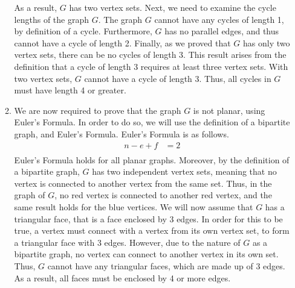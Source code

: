 \documentclass[a4paper]{article}
\begin{document}
\begin{enumerate}[label=\textbf{\arabic*.}]
\begin{enumerate}
\begin{center}
\begin{tikzpicture}
			\end{tikzpicture}
		\end{center}

		\bigbreak

		As a result, $\displaystyle{G}$ has two vertex sets. Next, we need to examine the cycle lengths of the graph $\displaystyle{G}$. The graph $\displaystyle{G}$ cannot have any cycles of length 1, by definition of a cycle. Furthermore, $\displaystyle{G}$ has no parallel edges, and thus cannot have a cycle of length 2. Finally, as we proved that $\displaystyle{G}$ has only two vertex sets, there can be no cycles of length 3. This result arises from the definition that a cycle of length 3 requires at least three vertex sets. With two vertex sets, $\displaystyle{G}$ cannot have a cycle of length 3. Thus, all cycles in $\displaystyle{G}$ must have length 4 or greater.

		\pagebreak

		\item We are now required to prove that the graph $\displaystyle{G}$ is not planar, using Euler's Formula. In order to do so, we will use the definition of a bipartite graph, and Euler's Formula. Euler's Formula is as follows.
		\begin{align*}
		n - e + f & = 2\\
		\end{align*}
		Euler's Formula holds for all planar graphs. Moreover, by the definition of a bipartite graph, $\displaystyle{G}$ has two independent vertex sets, meaning that no vertex is connected to another vertex from the same set. Thus, in the graph of $\displaystyle{G}$, no red vertex is connected to another red vertex, and the same result holds for the blue vertices. We will now assume that $\displaystyle{G}$ has a triangular face, that is a face enclosed by 3 edges. In order for this to be true, a vertex must connect with a vertex from its own vertex set, to form a triangular face with 3 edges. However, due to the nature of $\displaystyle{G}$ as a bipartite graph, no vertex can connect to another vertex in its own set. Thus, $\displaystyle{G}$ cannot have any triangular faces, which are made up of 3 edges. As a result, all faces must be enclosed by 4 or more edges. 

		\bigbreak


\end{enumerate}
\end{enumerate}
\end{document}

